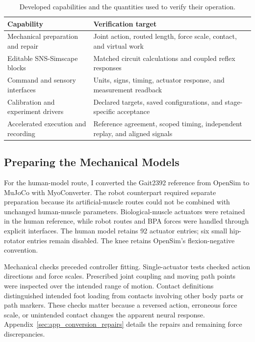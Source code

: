 \begin{table}[htbp]
\centering\small
\caption[Developed capabilities and verification targets]{Developed capabilities and the quantities used to verify their operation.}
\label{tab:sns_capability}
\begin{tabularx}{\textwidth}{@{}>{\raggedright\arraybackslash}p{}>{\raggedright\arraybackslash}X@{}}
\toprule
Capability & Verification target \\
\midrule
Mechanical preparation and repair & Joint action, routed length, force scale, contact, and virtual work \\
Editable SNS-Simscape blocks & Matched circuit calculations and coupled reflex responses \\
Command and sensory interfaces & Units, signs, timing, actuator response, and measurement readback \\
Calibration and experiment drivers & Declared targets, saved configurations, and stage-specific acceptance \\
Accelerated execution and recording & Reference agreement, scoped timing, independent replay, and aligned signals \\
\bottomrule
\end{tabularx}
\end{table}

\subsection{Preparing the Mechanical Models}\label{sec:sns_cad_methods}

For the human-model route, I converted the Gait2392 reference from OpenSim to MuJoCo with MyoConverter. The robot counterpart required separate preparation because its artificial-muscle routes could not be combined with unchanged human-muscle parameters. Biological-muscle actuators were retained in the human reference, while robot routes and BPA forces were handled through explicit interfaces. The human model retains 92 actuator entries; six small hip-rotator entries remain disabled. The knee retains OpenSim's flexion-negative convention.

Mechanical checks preceded controller fitting. Single-actuator tests checked action directions and force scales. Prescribed joint coupling and moving path points were inspected over the intended range of motion. Contact definitions distinguished intended foot loading from contacts involving other body parts or path markers. These checks matter because a reversed action, erroneous force scale, or unintended contact changes the apparent neural response. Appendix~\ref{sec:app_conversion_repairs} details the repairs and remaining force discrepancies.

